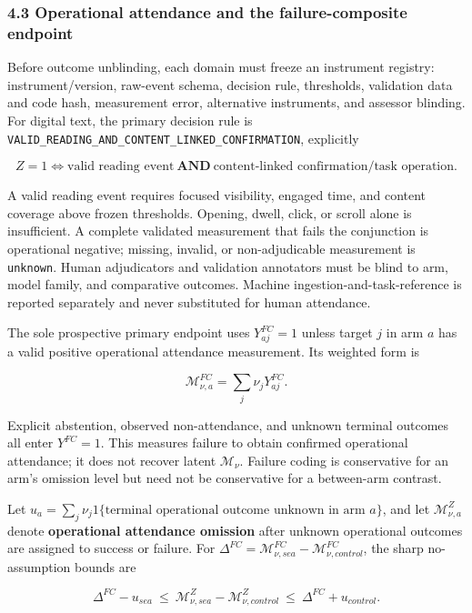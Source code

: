 \documentclass[
  11pt]{article}
\begin{document}
\subsubsection{4.3 Operational attendance and the failure-composite
endpoint}\label{operational-attendance-and-the-failure-composite-endpoint}

Before outcome unblinding, each domain must freeze an instrument
registry: instrument/version, raw-event schema, decision rule,
thresholds, validation data and code hash, measurement error,
alternative instruments, and assessor blinding. For digital text, the
primary decision rule is
\texttt{VALID\_READING\_AND\_CONTENT\_LINKED\_CONFIRMATION}, explicitly

\[Z=1\iff \text{valid reading event}\ \mathbf{AND}\ \text{content-linked confirmation/task operation}.\]

A valid reading event requires focused visibility, engaged time, and
content coverage above frozen thresholds. Opening, dwell, click, or
scroll alone is insufficient. A complete validated measurement that
fails the conjunction is operational negative; missing, invalid, or
non-adjudicable measurement is \texttt{unknown}. Human adjudicators and
validation annotators must be blind to arm, model family, and
comparative outcomes. Machine ingestion-and-task-reference is reported
separately and never substituted for human attendance.

The sole prospective primary endpoint uses \(Y^{FC}_{aj}=1\) unless
target \(j\) in arm \(a\) has a valid positive operational attendance
measurement. Its weighted form is

\[\mathcal M^{FC}_{\nu,a}=\sum_j\nu_jY^{FC}_{aj}.\tag{5}\]

Explicit abstention, observed non-attendance, and unknown terminal
outcomes all enter \(Y^{FC}=1\). This measures failure to obtain
confirmed operational attendance; it does not recover latent
\(\mathcal M_\nu\). Failure coding is conservative for an arm's omission
level but need not be conservative for a between-arm contrast.

Let
\(u_a=\sum_j\nu_j1\{\text{terminal operational outcome unknown in arm }a\}\),
and let \(\mathcal M_{\nu,a}^{Z}\) denote \textbf{operational attendance
omission} after unknown operational outcomes are assigned to success or
failure. For
\(\Delta^{FC}=\mathcal M^{FC}_{\nu,sea}-\mathcal M^{FC}_{\nu,control}\),
the sharp no-assumption bounds are

\[\Delta^{FC}-u_{sea}\ \le\ \mathcal M_{\nu,sea}^{Z}-\mathcal M_{\nu,control}^{Z}\ \le\ \Delta^{FC}+u_{control}.\tag{6}\]
\end{document}
